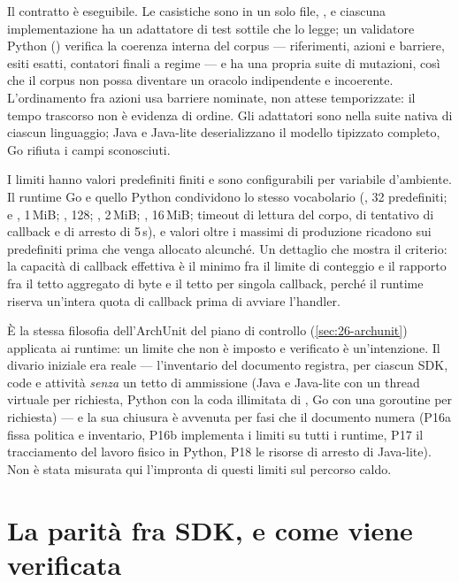 Il contratto \`e eseguibile. Le casistiche sono in un solo file,
, e ciascuna implementazione ha un adattatore
di test sottile che lo legge; un validatore Python
() verifica la coerenza interna del
corpus --- riferimenti, azioni e barriere, esiti esatti, contatori finali a
regime --- e ha una propria suite di mutazioni, cos\`i che il corpus non possa
diventare un oracolo indipendente e incoerente. L'ordinamento fra azioni usa
barriere nominate, non attese temporizzate: il tempo trascorso non \`e evidenza
di ordine. Gli adattatori sono nella suite nativa di ciascun linguaggio; Java e
Java-lite deserializzano il modello tipizzato completo, Go rifiuta i campi
sconosciuti.

I limiti hanno valori predefiniti finiti e sono configurabili per variabile
d'ambiente. Il runtime Go e quello Python condividono lo stesso vocabolario
(, 32 predefiniti;
 e , 1\,MiB;
, 128;
, 2\,MiB;
, 16\,MiB; timeout di lettura del
corpo, di tentativo di callback e di arresto di 5\,s), e valori oltre i massimi
di produzione ricadono sui predefiniti prima che venga allocato alcunch\'e. Un
dettaglio che mostra il criterio: la capacit\`a di callback effettiva \`e il
minimo fra il limite di conteggio e il rapporto fra il tetto aggregato di byte e
il tetto per singola callback, perch\'e il runtime riserva un'intera quota di
callback prima di avviare l'handler.

\`E la stessa filosofia dell'ArchUnit del piano di controllo
(\cref{sec:26-archunit}) applicata ai runtime: un limite che non \`e imposto e
verificato \`e un'intenzione. Il divario iniziale era reale ---
l'inventario del documento registra, per ciascun SDK, code e attivit\`a
\emph{senza} un tetto di ammissione (Java e Java-lite con un thread virtuale per
richiesta, Python con la coda illimitata di , Go con una
goroutine per richiesta) --- e la sua chiusura \`e avvenuta per fasi che il
documento numera (P16a fissa politica e inventario, P16b implementa i limiti su
tutti i runtime, P17 il tracciamento del lavoro fisico in Python, P18 le risorse
di arresto di Java-lite). Non \`e stata misurata qui l'impronta di questi limiti
sul percorso caldo.

\section{La parit\`a fra SDK, e come viene verificata}


